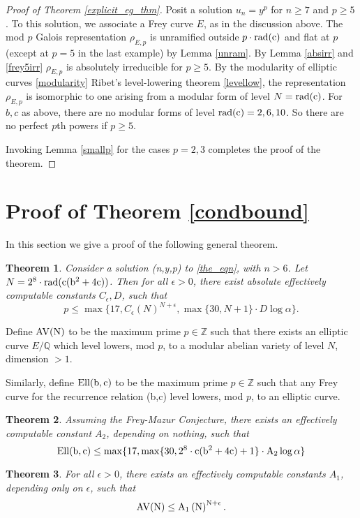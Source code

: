 \documentclass[12pt]{amsart}
\newtheorem{thm}{Theorem}[section]
\theoremstyle{definition}
\def\Q{{\mathbb Q}}
\def\Z{{\mathbb Z}}
\newcommand{\rad}{\rm rad}
\newcommand{\Ell}{\rm Ell}
\newcommand{\AV}{\rm AV}
\begin{document}
\begin{proof}[Proof of Theorem \ref{explicit_eg_thm}]
Posit a solution $u_n = y^p$ for $n \geq 7$ and $p \geq 5$.  To this solution, we associate a Frey curve $E$, as in the discussion above.  The mod $p$ Galois representation $\rho_{E,p}$ is unramified outside $p\cdot \rad{(c)}$ and flat at $p$ (except at $p=5$ in the last example) by Lemma \ref{unram}.   By Lemma \ref{absirr} and \ref{frey5irr} $\rho_{E,p}$ is absolutely irreducible for $p\geq 5$.  By the modularity of elliptic curves \ref{modularity} Ribet's level-lowering theorem \ref{levellow}, the representation $\rho_{E,p}$ is isomorphic to one arising from a modular form of level $N = \rad(c)$.  For $b,c$ as above, there are no modular forms of level $\rad(c)=2,6,10$.  So there are no perfect $p$th powers if $p \geq 5$.

Invoking Lemma \ref{smallp} for the cases $p=2,3$ completes the proof of the theorem.
\end{proof}


\section{Proof of Theorem \ref{condbound}}\label{genthmproof}

In this section we give a proof of the following general theorem.

\begin{thm}\label{condbound_inplace}
Consider a solution (n,y,p) to \eqref{the_eqn}, with $n > 6$. Let $N = 2^8 \cdot \rad(c(b^2+4c))$. Then for all $\epsilon > 0$, there exist absolute effectively computable constants $C_{\epsilon}, D$, such that
\[ p \leq \max\{17, C_{\epsilon} \left( N \right)^{N + \epsilon}, \max\{30, N+1\} \cdot D\log{\alpha} \}. \]

\end{thm}

Define $\AV(N)$ to be the maximum prime $p \in \Z$ such that there exists an elliptic curve $E/\Q$ which level lowers, mod $p$, to a modular abelian variety of level $N$, dimension $> 1$. 

Similarly, define $\Ell(b,c)$ to be the maximum prime $p \in \Z$ such that any Frey curve for the recurrence relation (b,c) level lowers, mod $p$, to an elliptic curve.

\begin{thm}\label{bound_ell}
Assuming the Frey-Mazur Conjecture, there exists an effectively computable constant $A_2$, depending on nothing, such that
\[\Ell(b,c) \leq \max\{17, \max\{30, 2^{8} \cdot c(b^2+4c)+1\} \cdot A_2\log{\alpha} \} \]
\end{thm}
\begin{thm}\label{bound_av}
For all $\epsilon > 0$, there exists an effectively computable constants $A_1$, depending only on $\epsilon$, such that
\[\AV(N) \leq A_1 \left( N \right)^{N + \epsilon}. \]
\end{thm}
\end{document}
